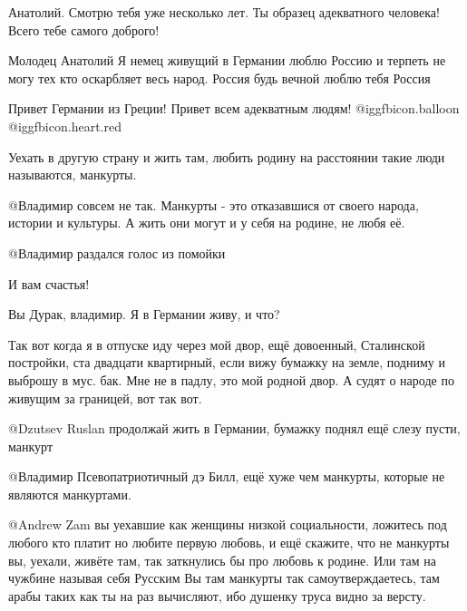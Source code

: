 \begin{multicols}{2}
Анатолий. Смотрю тебя уже несколько лет. Ты образец адекватного человека! Всего
тебе самого доброго!


Молодец Анатолий Я немец живущий в Германии люблю Россию и терпеть не могу тех
кто оскарбляет весь народ. Россия будь вечной люблю тебя Россия

\begin{itemize} %

Привет Германии из Греции! Привет всем адекватным людям! @igg{fbicon.balloon} @igg{fbicon.heart.red}


Уехать в другую страну и жить там, любить родину на расстоянии такие люди
называются, манкурты.


@Владимир совсем не так.  Манкурты - это отказавшися от своего народа, истории
и культуры. А жить они могут и у себя на родине, не любя её.

 @Владимир  раздался голос из помойки

И вам счастья!


Вы Дурак, владимир. Я в Германии живу, и что? 

Так вот когда я в отпуске иду через мой двор, ещё довоенный, Сталинской
постройки, ста двадцати квартирный, если вижу бумажку на земле, подниму и выброшу
в мус. бак. Мне не в падлу, это мой родной двор. А судят о народе по живущим за
границей, вот так вот.


@Dzutsev Ruslan  продолжай жить в Германии, бумажку поднял ещё слезу пусти,
манкурт


@Владимир  Псевопатриотичный дэ Билл, ещё хуже чем манкурты, которые не являются манкуртами.


@Andrew Zam  вы уехавшие как женщины низкой социальности, ложитесь под любого
кто платит но любите первую любовь, и ещё скажите, что не манкурты вы, уехали,
живёте там, так заткнулись бы про любовь к родине. Или там на чужбине называя
себя Русским Вы там манкурты так самоутверждаетесь, там арабы таких как ты на
раз вычисляют, ибо душенку труса видно за версту.

\end{itemize} %


\end{multicols}
